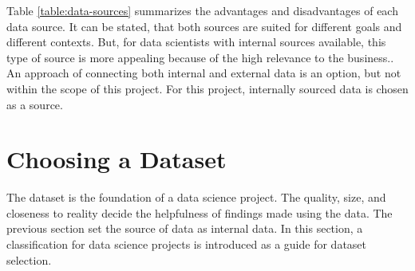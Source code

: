 	Table \ref{table:data-sources} summarizes the advantages and disadvantages of each data source. It can be stated, that both sources are suited for different goals and different contexts. But, for data scientists with internal sources available, this type of source is more appealing because of the high relevance to the business.. An approach of connecting both internal and external data is an option, but not within the scope of this project. For this project, internally sourced data is chosen as a source.
	
	\section{Choosing a Dataset}
	The dataset is the foundation of a data science project. The quality, size, and closeness to reality decide the helpfulness of findings made using the data. The previous section set the source of data as internal data. In this section, a classification for data science projects is introduced as a guide for dataset selection.
	
